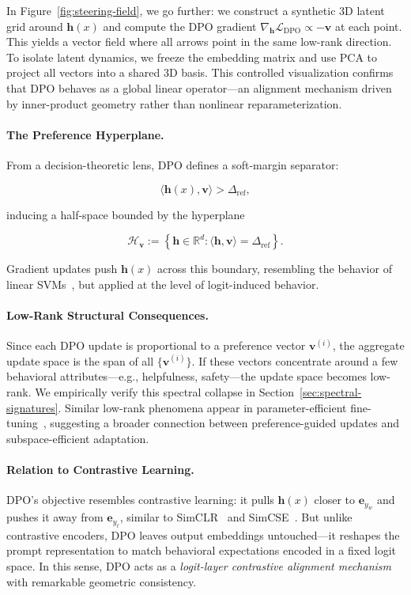 In Figure~\ref{fig:steering-field}, we go further: we construct a synthetic 3D latent grid around $\mathbf{h}(x)$ and compute the DPO gradient $\nabla_{\mathbf{h}} \mathcal{L}_{\text{DPO}} \propto -\mathbf{v}$ at each point. This yields a vector field where all arrows point in the same low-rank direction. To isolate latent dynamics, we freeze the embedding matrix and use PCA to project all vectors into a shared 3D basis. This controlled visualization confirms that DPO behaves as a global linear operator—an alignment mechanism driven by inner-product geometry rather than nonlinear reparameterization.

\paragraph{The Preference Hyperplane.}
From a decision-theoretic lens, DPO defines a soft-margin separator:

$$
\langle \mathbf{h}(x), \mathbf{v} \rangle > \Delta_{\mathrm{ref}},
$$

inducing a half-space bounded by the hyperplane

$$
\mathcal{H}_{\mathbf{v}} := \left\{ \mathbf{h} \in \mathbb{R}^d : \langle \mathbf{h}, \mathbf{v} \rangle = \Delta_{\mathrm{ref}} \right\}.
$$

Gradient updates push $\mathbf{h}(x)$ across this boundary, resembling the behavior of linear SVMs~\cite{cortes1995support}, but applied at the level of logit-induced behavior.










\paragraph{Low-Rank Structural Consequences.}
Since each DPO update is proportional to a preference vector $\mathbf{v}^{(i)}$, the aggregate update space is the span of all $\{ \mathbf{v}^{(i)} \}$. If these vectors concentrate around a few behavioral attributes—e.g., helpfulness, safety—the update space becomes low-rank. We empirically verify this spectral collapse in Section~\ref{sec:spectral-signatures}. Similar low-rank phenomena appear in parameter-efficient fine-tuning~\cite{hu2022lora, aghajanyan2021intrinsic}, suggesting a broader connection between preference-guided updates and subspace-efficient adaptation.

\paragraph{Relation to Contrastive Learning.}
DPO’s objective resembles contrastive learning: it pulls $\mathbf{h}(x)$ closer to $\mathbf{e}_{y_w}$ and pushes it away from $\mathbf{e}_{y_\ell}$, similar to SimCLR~\cite{chen2020simple} and SimCSE~\cite{gao2021simcse}. But unlike contrastive encoders, DPO leaves output embeddings untouched—it reshapes the prompt representation to match behavioral expectations encoded in a fixed logit space. In this sense, DPO acts as a \emph{logit-layer contrastive alignment mechanism} with remarkable geometric consistency.


